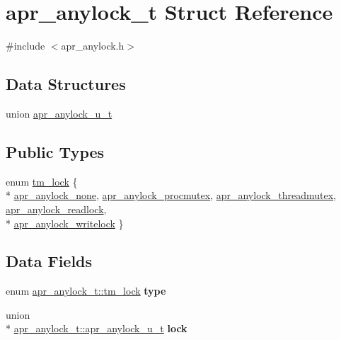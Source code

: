 \hypertarget{structapr__anylock__t}{\section{apr\-\_\-anylock\-\_\-t Struct Reference}
\label{structapr__anylock__t}
}


{\ttfamily \#include $<$apr\-\_\-anylock.\-h$>$}

\subsection*{Data Structures}
\begin{DoxyCompactItemize}
\item 
union \hyperlink{unionapr__anylock__t_1_1apr__anylock__u__t}{apr\-\_\-anylock\-\_\-u\-\_\-t}
\end{DoxyCompactItemize}
\subsection*{Public Types}
\begin{DoxyCompactItemize}
\item 
enum \hyperlink{structapr__anylock__t_a047e5c4d930f359618a96fd5e857f851}{tm\-\_\-lock} \{ \\*
\hyperlink{structapr__anylock__t_a047e5c4d930f359618a96fd5e857f851aa538eef19ecc0576a84344a5191abbd8}{apr\-\_\-anylock\-\_\-none}, 
\hyperlink{structapr__anylock__t_a047e5c4d930f359618a96fd5e857f851a441c78d4b9f1ed5620a3f7f3195ca9d7}{apr\-\_\-anylock\-\_\-procmutex}, 
\hyperlink{structapr__anylock__t_a047e5c4d930f359618a96fd5e857f851ad68c4c27cf2b58cabca43d35890045b6}{apr\-\_\-anylock\-\_\-threadmutex}, 
\hyperlink{structapr__anylock__t_a047e5c4d930f359618a96fd5e857f851a764d57b3fda600d8b891bef6128d02b5}{apr\-\_\-anylock\-\_\-readlock}, 
\\*
\hyperlink{structapr__anylock__t_a047e5c4d930f359618a96fd5e857f851a865d43ac3a9bb62f942e4e85b0befbda}{apr\-\_\-anylock\-\_\-writelock}
 \}
\end{DoxyCompactItemize}
\subsection*{Data Fields}
\begin{DoxyCompactItemize}
\item 
\hypertarget{structapr__anylock__t_abe78b2ee0daaee1b19c952c4f8fc903a}{enum \hyperlink{structapr__anylock__t_a047e5c4d930f359618a96fd5e857f851}{apr\-\_\-anylock\-\_\-t\-::tm\-\_\-lock} {\bfseries type}}\label{structapr__anylock__t_abe78b2ee0daaee1b19c952c4f8fc903a}

\item 
\hypertarget{structapr__anylock__t_a7064f0fcc63ef139e62260dc311687a2}{union \\*
\hyperlink{unionapr__anylock__t_1_1apr__anylock__u__t}{apr\-\_\-anylock\-\_\-t\-::apr\-\_\-anylock\-\_\-u\-\_\-t} {\bfseries lock}}\label{structapr__anylock__t_a7064f0fcc63ef139e62260dc311687a2}

\end{DoxyCompactItemize}


